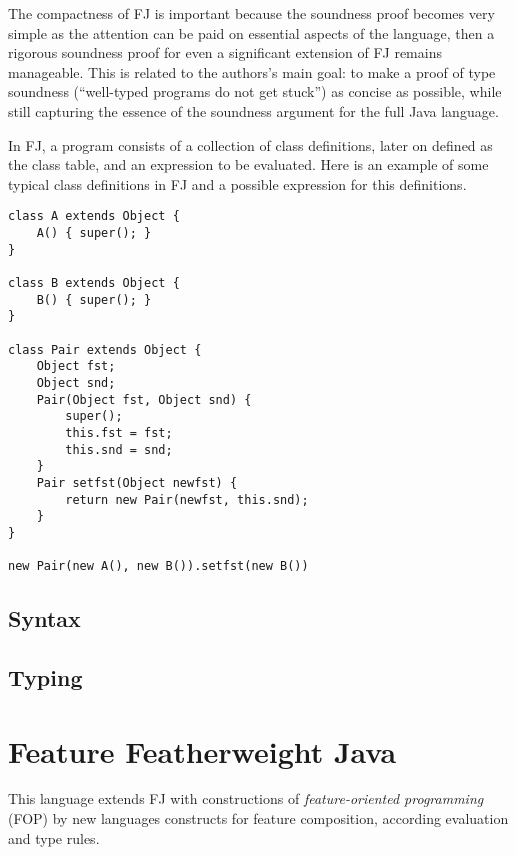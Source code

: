 The compactness of FJ is important because the soundness proof becomes very
simple as the attention can be paid on essential aspects of the language, then
a rigorous soundness proof for even a significant extension of FJ remains
manageable. This is related to the authors's main goal: to make a proof of type
soundness (``well-typed programs do not get stuck'') as concise as possible, while
still capturing the essence of the soundness argument for the full Java language.

In FJ, a program consists of a collection of class definitions, later on defined
as the class table, and an expression to be evaluated. Here is an example of some typical
class definitions in FJ and a possible expression for this definitions.

\begin{verbatim} 
class A extends Object {
    A() { super(); } 
} 

class B extends Object { 
    B() { super(); }
} 

class Pair extends Object { 
    Object fst; 
    Object snd;
    Pair(Object fst, Object snd) { 
        super(); 
        this.fst = fst; 
        this.snd = snd; 
    } 
    Pair setfst(Object newfst) { 
        return new Pair(newfst, this.snd); 
    } 
} 

new Pair(new A(), new B()).setfst(new B())
\end{verbatim}

\subsection{Syntax}



\subsection{Typing}

\section{Feature Featherweight Java}

This language extends FJ with constructions of \textit{feature-oriented
programming} (FOP) by new languages constructs for feature composition,
according evaluation and type rules.



